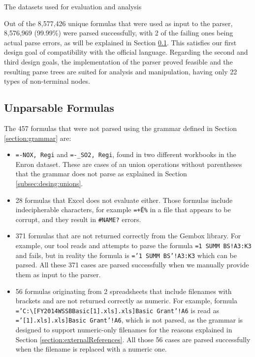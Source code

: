 \documentclass[times]{smrauth}
\begin{document}
\begin{table}[]
	\centering
	\caption{The datasets used for evaluation and analysis}
	\label{table:datasets}
	
\end{table}

Out of the 8,577,426 unique formulas that were used as input to the parser, 8,576,969 (99.99\%) were parsed successfully, with 2 of the failing ones being actual parse errors, as will be explained in Section \ref{subsection:unparsableFormulas}. This satisfies our first design goal of compatibility with the official language. Regarding the second and third design goals, the implementation of the parser proved feasible and the resulting parse trees are suited for analysis and manipulation, having only 22 types of non-terminal nodes.

\subsection{Unparsable Formulas}
\label{subsection:unparsableFormulas}
The 457 formulas that were not parsed using the grammar defined in Section \ref{section:grammar} are:

\begin{itemize}
	\item \texttt{=-NOX, Regi} and \texttt{=-_SO2, Regi}, found in two different workbooks in the Enron dataset. These are cases of an union operations without parentheses that the grammar does not parse as explained in Section \ref{subsec:desing:unions}.
	\item 28 formulas that Excel does not evaluate either. Those formulas include indecipherable characters, for example \texttt{=+Ë\%} in a file that appears to be corrupt, and they result in \texttt{\#NAME?} errors.
	\item 371 formulas that are not returned correctly from the Gembox library. For example, our tool reads and attempts to parse the formula \texttt{=1 SUMM BS!A3:K3} and fails, but in reality the formula is \texttt{='1 SUMM BS'!A3:K3} which can be parsed. All these 371 cases are parsed successfully when we manually provide them as input to the parser.
	\item 56 formulas originating from 2 spreadsheets that include filenames with brackets and are not returned correctly as numeric. For example, formula \texttt{='C:\textbackslash[FY2014WSSBBasic[1].xls].xls]Basic Grant'!A6} is read as \texttt{='[1].xls].xls]Basic Grant'!A6}, which is not parsed, as the grammar is designed to support numeric-only filenames for the reasons explained in Section \ref{section:externalReferences}. All those 56 cases are parsed successfully when the filename is replaced with a numeric one.
\end{itemize}
\end{document}
